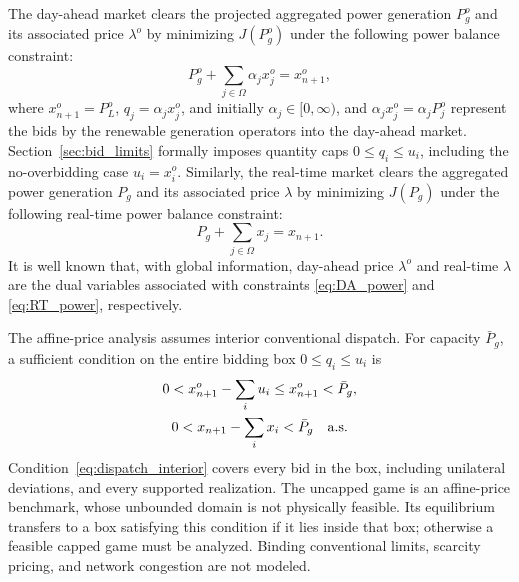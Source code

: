 \documentclass[journal]{IEEEtran}
\begin{document}
The day-ahead market clears the projected aggregated power generation $P_g^o$ and its associated price $\lambda^o$ by minimizing $J(P_g^o)$ under the following power balance constraint:
\begin{equation} 
P_g^o + \sum_{j\in\Omega} \alpha_j x_j^o  = x_{n+1}^o, \label{eq:DA_power}
\end{equation}
where $x_{n+1}^o=P_L^o$, $q_j=\alpha_jx_j^o$, and initially $\alpha_j\in[0,\infty)$, and $\alpha_j x_j^o =\alpha_j P_j^o$ represent the bids by the renewable generation operators into the day-ahead market. Section~\ref{sec:bid_limits} formally imposes quantity caps $0\leq q_i\leq u_i$, including the no-overbidding case $u_i=x_i^o$. Similarly, the real-time market clears the aggregated power generation $P_g$ and its associated price $\lambda$ by minimizing $J(P_g)$ under the following real-time power balance constraint:
\begin{equation} 
P_g + \sum_{j\in\Omega} x_j   = x_{n+1}. \label{eq:RT_power}
\end{equation}
It is well known that, with global information, day-ahead price $\lambda^o$ and real-time $\lambda$ are the dual variables associated with constraints \eqref{eq:DA_power} and \eqref{eq:RT_power}, respectively. 

The affine-price analysis assumes interior conventional dispatch. For capacity $\bar P_g$, a sufficient condition on the entire bidding box $0\leq q_i\leq u_i$ is
\begin{equation}
 \begin{gathered}0<x_{n+1}^o-\sum_i u_i\leq x_{n+1}^o<\bar P_g,\\
 0<x_{n+1}-\sum_i x_i<\bar P_g\quad\hbox{a.s.}\end{gathered}
 \label{eq:dispatch_interior}
\end{equation}
Condition~\eqref{eq:dispatch_interior} covers every bid in the box, including unilateral deviations, and every supported realization. The uncapped game is an affine-price benchmark, whose unbounded domain is not physically feasible. Its equilibrium transfers to a box satisfying this condition if it lies inside that box; otherwise a feasible capped game must be analyzed. Binding conventional limits, scarcity pricing, and network congestion are not modeled.
\end{document}
